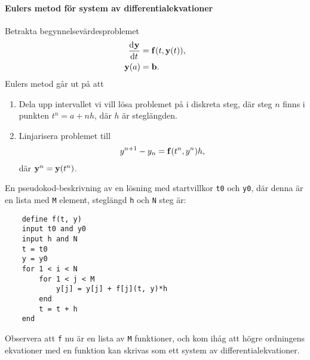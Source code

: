 \paragraph{Eulers metod för system av differentialekvationer}
Betrakta begynnelsevärdesproblemet
\begin{align*}
	\dv[]{\vb{y}}{t} (t) &= \vb{f}(t, \vb{y}(t)), \\
	\vb{y}(a)            &= \vb{b}.
\end{align*}
Eulers metod går ut på att
\begin{enumerate}
	\item Dela upp intervallet vi vill lösa problemet på i diskreta steg, där steg $n$ finns i punkten $t^{n} = a + nh$, där $h$ är steglängden.
	\item Linjarisera problemet till
	\begin{align*}
		y^{n + 1} - y_{n} = \vb{f}(t^{n}, y^{n})h,
	\end{align*}
	där $\vb{y}^{n} = \vb{y}(t^{n})$.
\end{enumerate}

En pseudokod-beskrivning av en lösning med startvillkor \verb|t0| och \verb|y0|, där denna är en lista med \verb|M| element, steglängd \verb|h| och \verb|N| steg är:
\begin{lstlisting}
	define f(t, y)
	input t0 and y0
	input h and N
	t = t0
	y = y0
	for 1 < i < N
		for 1 < j < M
			y[j] = y[j] + f[j](t, y)*h
		end
		t = t + h
	end
\end{lstlisting}

Observera att \verb|f| nu är en lista av \verb|M| funktioner, och kom ihåg att högre ordningens ekvationer med en funktion kan skrivas som ett system av differentialekvationer.